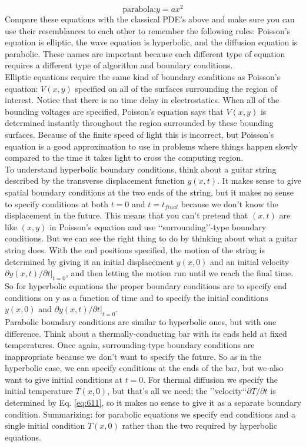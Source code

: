 \begin{equation}\label{eq:614}
\text{parabola:} y=a x^{2}
\end{equation}
Compare these equations with the classical PDE\rq s above and make sure you can use their resemblances to each other to remember the following rules: Poisson\rq s equation is elliptic, the wave equation is hyperbolic, and the diffusion equation is parabolic. These names are important because each different type of equation requires a different type of algorithm and boundary conditions. \\  Elliptic equations require the same kind of boundary conditions as Poisson\rq s equation: $V (x, y)$ specified on all of the surfaces surrounding the region of interest. Notice that there is no time delay in electrostatics. When all of the bounding voltages are specified, Poisson\rq s equation says that $V(x, y)$ is determined instantly throughout the region surrounded by these bounding surfaces. Because of the finite speed of light this is incorrect, but Poisson\rq s equation is a good approximation to use in problems where things happen slowly compared to the time it takes light to cross the computing region. \\
To understand hyperbolic boundary conditions, think about a guitar string
described by the transverse displacement function $y(x,t)$. It makes sense to
give spatial boundary conditions at the two ends of the string, but it makes no
sense to specify conditions at both $t = 0$ and $t = t_{final}$ because we don\rq t know the
displacement in the future. This means that you can\rq t pretend that $(x,t)$ are like
$(x, y)$ in Poisson\rq s equation and use \lq\lq surrounding\rq\rq -type boundary conditions. But
we can see the right thing to do by thinking about what a guitar string does. With
the end positions specified, the motion of the string is determined by giving it an
initial displacement $y(x,0)$ and an initial velocity $\partial y(x,t)/ \partial t\vert_{t=0}$, and then letting
the motion run until we reach the final time. So for hyperbolic equations the
proper boundary conditions are to specify end conditions on y as a function of
time and to specify the initial conditions $y(x,0)$ and $\partial y(x,t)/ \partial t\vert_{t=0}$. \\

Parabolic boundary conditions are similar to hyperbolic ones, but with one difference. Think about a thermally-conducting bar with its ends held at fixed
temperatures. Once again, surrounding-type boundary conditions are inappropriate because we don\rq t want to specify the future. So as in the hyperbolic case,
we can specify conditions at the ends of the bar, but we also want to give initial conditions at $t = 0$. For thermal diffusion we specify the initial temperature
$T (x,0)$, but that\rq s all we need; the \rq\rq velocity\lq\lq $\partial T / \partial t$ is determined by Eq. \ref{eq:611},
so it makes no sense to give it as a separate boundary condition. Summarizing:
for parabolic equations we specify end conditions and a single initial condition
$T (x,0)$ rather than the two required by hyperbolic equations. \\ 

